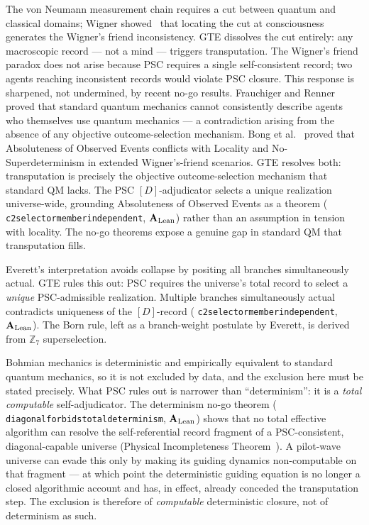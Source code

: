 \documentclass[11pt]{article}
\theoremstyle{remark}
\newcommand{\lean}[1]{%
  \penalty-100
  \begingroup\def\_{\textunderscore\allowbreak}\texttt{#1}\endgroup}
\newcommand{\CatAL}{\ensuremath{\textbf{A}_{\rm Lean}}}
\begin{document}
\medskip
\begin{termlist}

\item[Copenhagen~\cite{vonNeumann1955,Wigner1961}]
  The von Neumann measurement chain requires a cut between quantum and classical
  domains; Wigner showed~\cite{Wigner1961} that locating the cut at consciousness
  generates the Wigner's friend inconsistency. GTE dissolves the cut entirely:
  any macroscopic record --- not a mind --- triggers transputation. The Wigner's
  friend paradox does not arise because PSC requires a single self-consistent
  record; two agents reaching inconsistent records would violate PSC closure.
  This response is sharpened, not undermined, by recent no-go results.
  Frauchiger and Renner~\cite{FrauchigerRenner2018} proved that standard quantum
  mechanics cannot consistently describe agents who themselves use quantum mechanics
  --- a contradiction arising from the absence of any objective outcome-selection
  mechanism. Bong et al.~\cite{Bong2020} proved that Absoluteness of Observed
  Events conflicts with Locality and No-Superdeterminism in extended Wigner's-friend
  scenarios. GTE resolves both: transputation is precisely the objective
  outcome-selection mechanism that standard QM lacks. The PSC $[D]$-adjudicator
  selects a unique realization universe-wide, grounding Absoluteness of Observed
  Events as a theorem (\lean{c2\_selector\_member\_independent}, \CatAL) rather
  than an assumption in tension with locality. The no-go theorems expose a genuine
  gap in standard QM that transputation fills.

\item[Many-worlds]
  Everett's interpretation avoids collapse by positing all branches simultaneously
  actual. GTE rules this out: PSC requires the universe's total record to select a
  \emph{unique} PSC-admissible realization. Multiple branches simultaneously actual
  contradicts uniqueness of the $[D]$-record
  (\lean{c2\_selector\_member\_independent}, \CatAL). The Born rule, left as a
  branch-weight postulate by Everett, is derived from $\mathbb{Z}_7$ superselection.

\item[Pilot wave (de Broglie--Bohm)]
  Bohmian mechanics is deterministic and empirically equivalent to standard quantum
  mechanics, so it is not excluded by data, and the exclusion here must be stated
  precisely. What PSC rules out is narrower than ``determinism'': it is a \emph{total
  computable} self-adjudicator. The determinism no-go theorem
  (\lean{diagonal\_forbids\allowbreak\_total\_determinism}, \CatAL) shows that no total effective algorithm can resolve the
  self-referential record fragment of a PSC-consistent, diagonal-capable universe
  (Physical Incompleteness Theorem~\cite{SpivackNEMS11}). A pilot-wave universe can
  evade this only by making its guiding dynamics non-computable on that fragment ---
  at which point the deterministic guiding equation is no longer a closed algorithmic
  account and has, in effect, already conceded the transputation step. The exclusion
  is therefore of \emph{computable} deterministic closure, not of determinism as such.


\end{termlist}
\end{document}
